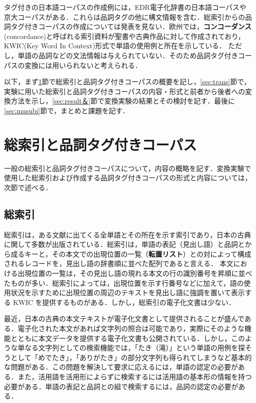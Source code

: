 タグ付きの日本語コーパスの作成例には，EDR電子化辞書の日本語コーパス\cite{EDR2001}や京大コーパス\cite{KyouDai1997}がある．これらは品詞タグの他に構文情報を含む．総索引からの品詞タグ付きコーパスの作成については発表を見ない．欧州では，{\bf コンコーダンス}(concordance)と呼ばれる索引資料が聖書や古典作品に対して作成されており，KWIC(Key Word In Context)形式で単語の使用例と所在を示している．
ただし，単語の品詞などの文法情報は与えられていない\cite{Witten1999}．そのため品詞タグ付きコーパスの変換には用いられないと考えられる．

以下，まず\ref{sec:Conc&Corpus}節で総索引と品詞タグ付きコーパスの概要を記し，\ref{sec:trans}節で，実験に用いた総索引と品詞タグ付きコーパスの内容・形式と前者から後者への変換方法を示し，\ref{sec:result＆}節で変換実験の結果とその検討を記す．最後に\ref{sec:musubi}節で，まとめと課題を記す．

\section{総索引と品詞タグ付きコーパス}
\label{sec:Conc&Corpus}
一般の総索引と品詞タグ付きコーパスについて，内容の概略を記す．変換実験で使用した総索引および作成する品詞タグ付きコーパスの形式と内容については，次節で述べる．
\subsection{総索引}
\label{sec:concordance}
総索引は，ある文献に出てくる全単語とその所在を示す索引であり，日本の古典に関して多数が出版されている．総索引は，単語の表記（見出し語）と品詞とから成るキーと，その本文での出現位置の一覧（{\bf 転置リスト}）との対によって構成されるレコードを，見出し語の辞書順に並べた配列であると言える．
本文における出現位置の一覧は，その見出し語の現れる本文の行の識別番号を昇順に並べたものが多い．総索引によっては，出現位置を示す行番号などに加えて，語の使用状況を示すために出現位置の周辺のテキストを見出し語に強調を置いて表示する KWIC を提供するものがある\cite{Yamada1958}．しかし，総索引の電子化文書は少ない．

最近，日本の古典の本文テキストが電子化文書として提供されることが盛んである．電子化された本文があれば文字列の照合は可能であり，実際にそのような機能とともに本文データを提供する電子化文書も公開されている．しかし，このような単なる文字列としての検索機能では，「たき（滝）」という単語の用例を探そうとして「めでたき」，「ありがたき」の部分文字列も得られてしまうなど基本的な問題がある\cite{Hayashi2000}．この問題を解決して要求に応えるには，単語の認定の必要がある．また，活用語を活用形によらずに検索するには活用語の基本形の情報を持つ必要がある．単語の表記と品詞との組で検索するには，品詞の認定の必要がある．

